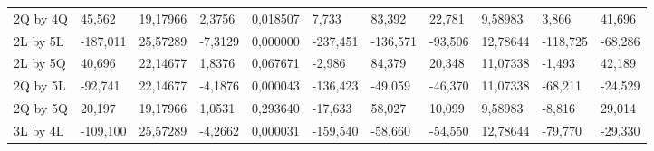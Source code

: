 \begin{table}[H]
{\begin{tabular}{lllllllllll}
\rowcolor[HTML]{FFFFFF} 
2Q by 4Q                              & {\color[HTML]{FF0000} 45,562}   & {\color[HTML]{FF0000} 19,17966} & {\color[HTML]{FF0000} 2,3756}   & {\color[HTML]{FF0000} 0,018507} & {\color[HTML]{FF0000} 7,733}          & {\color[HTML]{FF0000} 83,392}         & {\color[HTML]{FF0000} 22,781}   & {\color[HTML]{FF0000} 9,58983}       & {\color[HTML]{FF0000} 3,866}          & {\color[HTML]{FF0000} 41,696}         \\
\rowcolor[HTML]{FFFFFF} 
2L by 5L                              & {\color[HTML]{FF0000} -187,011} & {\color[HTML]{FF0000} 25,57289} & {\color[HTML]{FF0000} -7,3129}  & {\color[HTML]{FF0000} 0,000000} & {\color[HTML]{FF0000} -237,451}       & {\color[HTML]{FF0000} -136,571}       & {\color[HTML]{FF0000} -93,506}  & {\color[HTML]{FF0000} 12,78644}      & {\color[HTML]{FF0000} -118,725}       & {\color[HTML]{FF0000} -68,286}        \\
\rowcolor[HTML]{FFFFFF} 
2L by 5Q                              & 40,696                          & 22,14677                        & 1,8376                          & 0,067671                        & -2,986                                & 84,379                                & 20,348                          & 11,07338                             & -1,493                                & 42,189                                \\
\rowcolor[HTML]{FFFFFF} 
2Q by 5L                              & {\color[HTML]{FF0000} -92,741}  & {\color[HTML]{FF0000} 22,14677} & {\color[HTML]{FF0000} -4,1876}  & {\color[HTML]{FF0000} 0,000043} & {\color[HTML]{FF0000} -136,423}       & {\color[HTML]{FF0000} -49,059}        & {\color[HTML]{FF0000} -46,370}  & {\color[HTML]{FF0000} 11,07338}      & {\color[HTML]{FF0000} -68,211}        & {\color[HTML]{FF0000} -24,529}        \\
\rowcolor[HTML]{FFFFFF} 
2Q by 5Q                              & 20,197                          & 19,17966                        & 1,0531                          & 0,293640                        & -17,633                               & 58,027                                & 10,099                          & 9,58983                              & -8,816                                & 29,014                                \\
\rowcolor[HTML]{FFFFFF} 
3L by 4L                              & {\color[HTML]{FF0000} -109,100} & {\color[HTML]{FF0000} 25,57289} & {\color[HTML]{FF0000} -4,2662}  & {\color[HTML]{FF0000} 0,000031} & {\color[HTML]{FF0000} -159,540}       & {\color[HTML]{FF0000} -58,660}        & {\color[HTML]{FF0000} -54,550}  & {\color[HTML]{FF0000} 12,78644}      & {\color[HTML]{FF0000} -79,770}        & {\color[HTML]{FF0000} -29,330}        \\

\end{tabular}}
\end{table}
